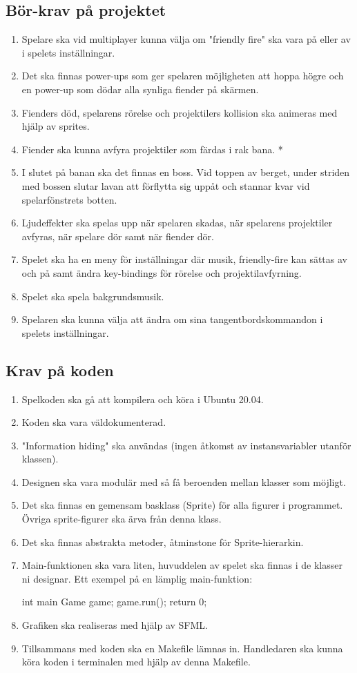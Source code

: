\documentclass{TDP005mall}
\begin{document}
\subsection{Bör-krav på projektet}
\begin{enumerate}
\item Spelare ska vid multiplayer kunna välja om "friendly fire" ska vara på eller av i spelets inställningar. 
\item Det ska finnas power-ups som ger spelaren möjligheten att hoppa högre och en power-up som dödar alla synliga fiender på skärmen.
\item Fienders död, spelarens rörelse och projektilers kollision ska animeras med hjälp av sprites.
\item Fiender ska kunna avfyra projektiler som färdas i rak bana. *
\item I slutet på banan ska det finnas en boss. Vid toppen av berget, under striden med bossen slutar lavan att förflytta sig uppåt och stannar kvar vid spelarfönstrets botten.
\item Ljudeffekter ska spelas upp när spelaren skadas, när spelarens projektiler avfyras, när spelare dör samt när fiender dör.
\item Spelet ska ha en meny för inställningar där musik, friendly-fire kan sättas av och på samt ändra key-bindings för rörelse och projektilavfyrning.
\item Spelet ska spela bakgrundsmusik.
\item Spelaren ska kunna välja att ändra om sina tangentbordskommandon i spelets inställningar.
\end{enumerate}

\subsection{Krav på koden}
\begin{enumerate}
\item    Spelkoden ska gå att kompilera och köra i Ubuntu 20.04.
\item    Koden ska vara väldokumenterad.
\item    "Information hiding" ska användas (ingen åtkomst av instansvariabler utanför klassen).
\item    Designen ska vara modulär med så få beroenden mellan klasser som möjligt.
\item    Det ska finnas en gemensam basklass (Sprite) för alla figurer i programmet. Övriga sprite-figurer ska ärva från denna klass.
\item    Det ska finnas abstrakta metoder, åtminstone för Sprite-hierarkin.
\item    Main-funktionen ska vara liten, huvuddelen av spelet ska finnas i de klasser ni designar. Ett exempel på en lämplig main-funktion:

    int main {
       Game game;
       game.run();
       return 0;
    }
        

\item    Grafiken ska realiseras med hjälp av SFML.
\item    Tillsammans med koden ska en Makefile lämnas in. Handledaren ska kunna köra koden i terminalen med hjälp av denna Makefile.
\end{enumerate}
\end{document}
